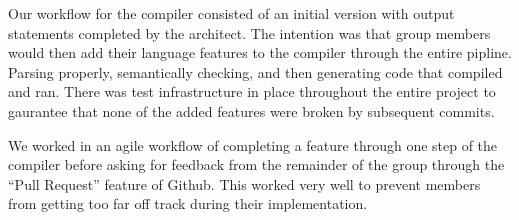 
Our workflow for the compiler consisted of an initial version with output statements completed by the architect.
The intention was that group members would then add their language features to the compiler through the entire pipline.
Parsing properly, semantically checking, and then generating code that compiled and ran.
There was test infrastructure in place throughout the entire project to gaurantee that none of the added features were broken by subsequent commits.

We worked in an agile workflow of completing a feature through one step of the compiler before asking for feedback from the remainder of the group through the ``Pull Request'' feature of Github.
This worked very well to prevent members from getting too far off track during their implementation.





